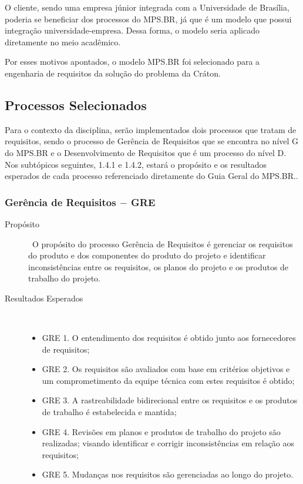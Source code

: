   O cliente, sendo uma empresa júnior integrada com a Universidade de Brasília, poderia se
  beneficiar dos processos do MPS.BR, já que é um modelo que possui integração universidade-empresa.
  Dessa forma, o modelo seria aplicado diretamente no meio acadêmico.

  Por esses motivos apontados, o modelo MPS.BR foi selecionado para a engenharia de requisitos da
  solução do problema da Cráton.

\subsection{Processos Selecionados}

  Para o contexto da disciplina, serão implementados dois processos que tratam de
  requisitos, sendo o processo de Gerência de Requisitos que se encontra no nível
  G do MPS.BR e o Desenvolvimento de Requisitos que é um processo do nível D. Nos
  subtópicos seguintes, 1.4.1 e 1.4.2, estará o propósito e os resultados esperados
  de cada processo referenciado diretamente do Guia Geral do MPS.BR.\cite{softexmps}.

\subsubsection{Gerência de Requisitos $-$ GRE}

  \begin{description}
    \item[Propósito] \
      O propósito do processo Gerência de Requisitos é gerenciar os requisitos do
      produto e dos componentes do produto do projeto e identificar inconsistências
      entre os requisitos, os planos do projeto e os produtos de trabalho do projeto.
    \item [Resultados Esperados] \
      \begin{itemize}
        \item GRE 1. O entendimento dos requisitos é obtido junto aos fornecedores de requisitos;
        \item GRE 2. Os requisitos são avaliados com base em critérios objetivos e um comprometimento
              da equipe técnica com estes requisitos é obtido;
        \item GRE 3. A rastreabilidade bidirecional entre os requisitos e os produtos de trabalho
              é estabelecida e mantida;
        \item GRE 4. Revisões em planos e produtos de trabalho do projeto são realizadas;
              visando identificar e corrigir inconsistências em relação aos requisitos;
        \item GRE 5. Mudanças nos requisitos são gerenciadas ao longo do projeto.
      \end{itemize}
    \end{description}

